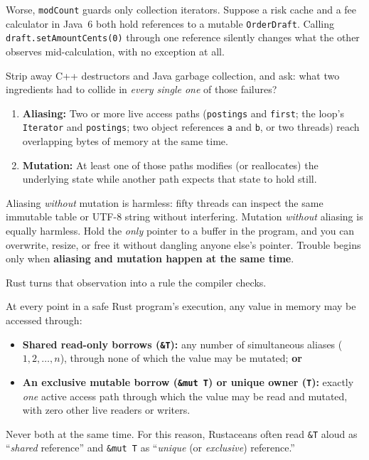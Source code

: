 Worse, \texttt{modCount} guards only collection iterators. Suppose a risk cache and a fee calculator in Java~6 both hold references to a mutable \texttt{OrderDraft}. Calling \texttt{draft.setAmountCents(0)} through one reference silently changes what the other observes mid-calculation, with no exception at all.

\begin{intuitionbox}
Strip away C++ destructors and Java garbage collection, and ask: what two ingredients had to collide in \emph{every single one} of those failures?
\begin{enumerate}
  \item \textbf{Aliasing:} Two or more live access paths (\texttt{postings} and \texttt{first}; the loop's \texttt{Iterator} and \texttt{postings}; two object references \texttt{a} and \texttt{b}, or two threads) reach overlapping bytes of memory at the same time.
  \item \textbf{Mutation:} At least one of those paths modifies (or reallocates) the underlying state while another path expects that state to hold still.
\end{enumerate}
Aliasing \emph{without} mutation is harmless: fifty threads can inspect the same immutable table or UTF-8 string without interfering. Mutation \emph{without} aliasing is equally harmless. Hold the \emph{only} pointer to a buffer in the program, and you can overwrite, resize, or free it without dangling anyone else's pointer. Trouble begins only when \textbf{aliasing and mutation happen at the same time}.
\end{intuitionbox}

Rust turns that observation into a rule the compiler checks.

\begin{definition}
\label{ch03:def-aliasing-xor-mut}
At every point in a safe Rust program's execution, any value in memory may be accessed through:
\begin{itemize}
  \item \textbf{Shared read-only borrows (\texttt{\&T}):} any number of simultaneous aliases ($1, 2, \dots, n$), through none of which the value may be mutated; \textbf{or}
  \item \textbf{An exclusive mutable borrow (\texttt{\&mut T}) or unique owner (\texttt{T}):} exactly \emph{one} active access path through which the value may be read and mutated, with zero other live readers or writers.
\end{itemize}
Never both at the same time. For this reason, Rustaceans often read \texttt{\&T} aloud as ``\emph{shared} reference'' and \texttt{\&mut T} as ``\emph{unique} (or \emph{exclusive}) reference.''
\end{definition}


